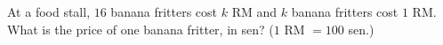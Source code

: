 At a food stall, $16$ banana fritters cost $k$ RM and $k$ banana fritters cost $1$ RM. What is the price of one banana fritter, in sen? ($1$ RM $=100$ sen.)
